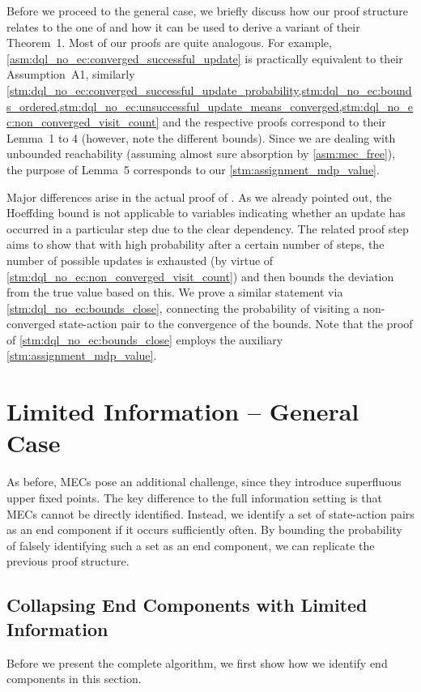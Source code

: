 \documentclass{theoretics}
\begin{document}
\begin{remark}
	Before we proceed to the general case, we briefly discuss how our proof structure relates to the one of \cite{DBLP:conf/icml/StrehlLWLL06} and how it can be used to derive a variant of their Theorem~1.
	Most of our proofs are quite analogous.
	For example, \cref{asm:dql_no_ec:converged_successful_update} is practically equivalent to their Assumption~A1, similarly \cref{stm:dql_no_ec:converged_successful_update_probability,stm:dql_no_ec:bounds_ordered,stm:dql_no_ec:unsuccessful_update_means_converged,stm:dql_no_ec:non_converged_visit_count} and the respective proofs correspond to their Lemma~1 to 4 (however, note the different bounds).
	Since we are dealing with unbounded reachability (assuming almost sure absorption by \cref{asm:mec_free}), the purpose of Lemma~5 corresponds to our \cref{stm:assignment_mdp_value}.

	Major differences arise in the actual proof of \cite[Theorem~1]{DBLP:conf/icml/StrehlLWLL06}.
	As we already pointed out, the Hoeffding bound is not applicable to variables indicating whether an update has occurred in a particular step due to the clear dependency.
	The related proof step aims to show that with high probability after a certain number of steps, the number of possible updates is exhausted (by virtue of \cref{stm:dql_no_ec:non_converged_visit_count}) and then bounds the deviation from the true value based on this.
	We prove a similar statement via \cref{stm:dql_no_ec:bounds_close}, connecting the probability of visiting a non-converged state-action pair to the convergence of the bounds.
	Note that the proof of \cref{stm:dql_no_ec:bounds_close} employs the auxiliary \cref{stm:assignment_mdp_value}.
\end{remark}
 	\section{Limited Information -- General Case} \label{sec:dql}

As before, MECs pose an additional challenge, since they introduce superfluous upper fixed points.
The key difference to the full information setting is that MECs cannot be directly identified.
Instead, we identify a set of state-action pairs as an end component if it occurs sufficiently often.
By bounding the probability of falsely identifying such a set as an end component, we can replicate the previous proof structure.
\subsection{Collapsing End Components with Limited Information}
Before we present the complete algorithm, we first show how we identify end components in this section.
\end{document}
